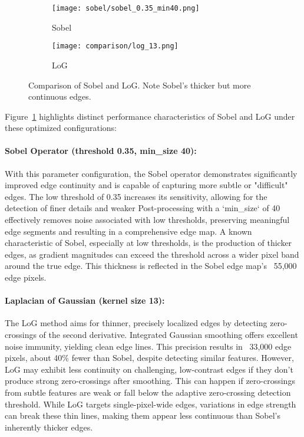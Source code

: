 \documentclass[12pt,a4paper]{article}
\begin{document}
\begin{figure}[H]
    \centering
    \begin{subfigure}{0.48\textwidth}
        \texttt{[image: sobel/sobel\_0.35\_min40.png]}
        \caption{Sobel}
    \end{subfigure}
    \hfill
    \begin{subfigure}{0.48\textwidth}
        \texttt{[image: comparison/log\_13.png]}
        \caption{LoG}
    \end{subfigure}
    \caption{Comparison of Sobel and LoG. Note Sobel's thicker but more continuous edges.}
    \label{fig:edge_comp}
\end{figure}

Figure~\ref{fig:edge_comp} highlights distinct performance characteristics of Sobel and LoG under these optimized configurations:

\paragraph{Sobel Operator (threshold 0.35, min\_size 40):} With this parameter configuration, the Sobel operator demonstrates significantly improved edge continuity and is capable of capturing more subtle or "difficult" edges. The low threshold of 0.35 increases its sensitivity, allowing for the detection of finer details and weaker Post-processing with a `min\_size` of 40 effectively removes noise associated with low thresholds, preserving meaningful edge segments and resulting in a comprehensive edge map. A known characteristic of Sobel, especially at low thresholds, is the production of thicker edges, as gradient magnitudes can exceed the threshold across a wider pixel band around the true edge. This thickness is reflected in the Sobel edge map's ~55,000 edge pixels.

\paragraph{Laplacian of Gaussian (kernel size 13):} The LoG method aims for thinner, precisely localized edges by detecting zero-crossings of the second derivative. Integrated Gaussian smoothing offers excellent noise immunity, yielding clean edge lines. This precision results in ~33,000 edge pixels, about 40\% fewer than Sobel, despite detecting similar features. However, LoG may exhibit less continuity on challenging, low-contrast edges if they don't produce strong zero-crossings after smoothing. This can happen if zero-crossings from subtle features are weak or fall below the adaptive zero-crossing detection threshold. While LoG targets single-pixel-wide edges, variations in edge strength can break these thin lines, making them appear less continuous than Sobel's inherently thicker edges.
\end{document}
